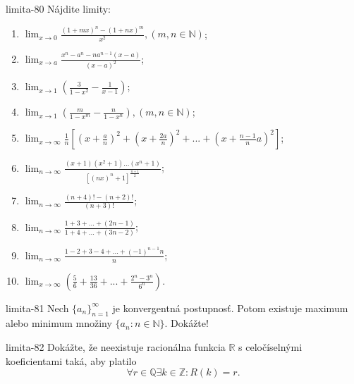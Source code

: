 \begin{defproblem}{limita-80}
Nájdite limity:
\begin{multicols}{2}
\begin{enumerate}
    \item $\lim_{x \rightarrow 0} \frac{(1+mx)^n-(1+nx)^m}{x^2},(m,n \in \mathbb{N})$;
    \item $\lim_{x \rightarrow a} \frac{x^n-a^n-na^{n-1}(x-a)}{(x-a)^2}$;
    \item $\lim_{x \rightarrow 1} (\frac{3}{1-x^2}-\frac{1}{x-1})$;
    \item $\lim_{x \rightarrow 1} (\frac{m}{1-x^m}-\frac{n}{1-x^n}),(m,n \in \mathbb{N})$;
    \item $\lim_{x \rightarrow \infty} \frac{1}{n}[(x+\frac{a}{n})^2+(x+\frac{2a}{n})^2+...+(x+\frac{n-1}{n}a)^2]$;
    \item $\lim_{n\rightarrow \infty} \frac{(x+1)(x^2+1)...(x^n+1)}{[(nx)^n+1]^{\frac{n+1}{2}}}$;
    \item $\lim_{n \rightarrow \infty} \frac{(n+4)!-(n+2)!}{(n+3)!}$;
    \item $\lim_{n \rightarrow \infty} \frac{1+3+...+(2n-1)}{1+4+...+(3n-2)}$;
    \item $\lim_{n \rightarrow \infty} \frac{1-2+3-4+...+(-1)^{n-1}n}{n}$;
    \item $\lim_{x \rightarrow \infty} (\frac{5}{6}+\frac{13}{36}+...+\frac{2^n-3^n}{6^n})$.
\end{enumerate}
\end{multicols}
\end{defproblem}

\begin{defproblem}{limita-81}
Nech ${\{a_n\}}_{n=1}^\infty$ je konvergentná postupnosť. Potom existuje maximum alebo minimum množiny $\{a_n: n \in \mathbb{N}\}$. Dokážte!
\end{defproblem}

\begin{defproblem}{limita-82}
Dokážte, že neexistuje racionálna funkcia $\mathbb{R}$ s celočíselnými koeficientami taká, aby platilo 
$$\forall r \in \mathbb{Q} \exists k \in \mathbb{Z}: R(k)=r.$$
\end{defproblem}

